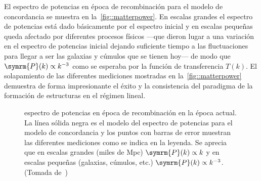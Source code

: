 El espectro de potencias en época de recombinación para el modelo de concordancia se muestra en la~\autoref{fig::matterpower}. En escalas grandes el espectro de potencias está dado básicamente por el espectro inicial y en escalas pequeñas queda afectado por diferentes procesos físicos ---que dieron lugar a una variación en el espectro de potencias inicial dejando suficiente tiempo a las fluctuaciones para llegar a ser las galaxias y cúmulos que se tienen hoy--- de modo que \(\symrm{P}(k)\propto k^{-3}\) como se esperaba por la función de transferencia \(T(k)\). El solapamiento de las diferentes mediciones mostradas en la~\autoref{fig::matterpower} demuestra de forma impresionante el éxito y la consistencia del paradigma de la formación de estructuras en el régimen lineal.
\begin{figure}[h]
    \centering
    \def\svgwidth{0.95\textwidth}
    
    \caption[espectro de potencias en época de recombinación en la época actual]{espectro de potencias en época de recombinación en la época actual. La línea sólida negra es el modelo del espectro de potencias para el modelo de concordancia y los puntos con barras de error muestran las diferentes mediciones como se indica en la leyenda. Se aprecia que en escalas grandes (miles de Mpc) \(\symrm{P}(k)\propto k\) y en escalas pequeñas (galaxias, cúmulos, etc.) \(\symrm{P}(k)\propto k^{-3}\). (Tomada de~\cite{collaboration2020planck1})}
    \label{fig::matterpower}
\end{figure}